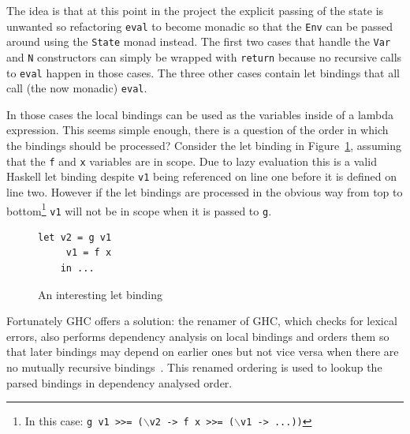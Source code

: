 The idea is that at this point in the project the explicit passing of the state is unwanted so refactoring \texttt{eval} to become monadic so that the \texttt{Env} can be passed around using the \texttt{State} monad instead. The first two cases that handle the \texttt{Var} and \texttt{N} constructors can simply be wrapped with \texttt{return} because no recursive calls to \texttt{eval} happen in those cases. The three other cases contain let bindings that all call (the now monadic) \texttt{eval}. 

In those cases the local bindings can be used as the variables inside of a lambda expression. This seems simple enough, there is a question of the order in which the bindings should be processed? Consider the let binding in Figure~\ref{intLet}, assuming that the \texttt{f} and \texttt{x} variables are in scope. Due to lazy evaluation this is a valid Haskell let binding despite \texttt{v1} being referenced on line one before it is defined on line two. However if the let bindings are processed in the obvious way from top to bottom\footnote{In this case: \texttt{g v1 >>= ($\backslash$v2 -> f x >>= ($\backslash$v1 -> ...))}} \texttt{v1} will not be in scope when it is passed to \texttt{g}.  

\begin{figure}[t]
\begin{lstlisting}
let v2 = g v1
     v1 = f x
    in ...
\end{lstlisting}
\caption{An interesting let binding}
\label{intLet}
\end{figure}

Fortunately GHC offers a solution: the renamer of GHC, which checks for lexical errors, also performs dependency analysis on local bindings and orders them so that later bindings may depend on earlier ones but not vice versa when there are no mutually recursive bindings~\citep{ghcApi}. This renamed ordering is used to lookup the parsed bindings in dependency analysed order.

